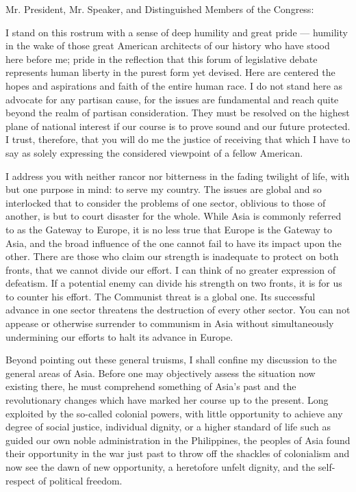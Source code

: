\documentclass[a4paper]{amsbook}
\begin{document}
Mr. President, Mr. Speaker, and Distinguished Members of the Congress:

I stand on this rostrum with a sense of deep humility and great pride — humility in the wake of those great American architects of our history who have stood here before me; pride in the reflection that this forum of legislative debate represents human liberty in the purest form yet devised. Here are centered the hopes and aspirations and faith of the entire human race. I do not stand here as advocate for any partisan cause, for the issues are fundamental and reach quite beyond the realm of partisan consideration. They must be resolved on the highest plane of national interest if our course is to prove sound and our future protected. I trust, therefore, that you will do me the justice of receiving that which I have to say as solely expressing the considered viewpoint of a fellow American.

I address you with neither rancor nor bitterness in the fading twilight of life, with but one purpose in mind: to serve my country. The issues are global and so interlocked that to consider the problems of one sector, oblivious to those of another, is but to court disaster for the whole. While Asia is commonly referred to as the Gateway to Europe, it is no less true that Europe is the Gateway to Asia, and the broad influence of the one cannot fail to have its impact upon the other. There are those who claim our strength is inadequate to protect on both fronts, that we cannot divide our effort. I can think of no greater expression of defeatism. If a potential enemy can divide his strength on two fronts, it is for us to counter his effort. The Communist threat is a global one. Its successful advance in one sector threatens the destruction of every other sector. You can not appease or otherwise surrender to communism in Asia without simultaneously undermining our efforts to halt its advance in Europe.

Beyond pointing out these general truisms, I shall confine my discussion to the general areas of Asia. Before one may objectively assess the situation now existing there, he must comprehend something of Asia's past and the revolutionary changes which have marked her course up to the present. Long exploited by the so-called colonial powers, with little opportunity to achieve any degree of social justice, individual dignity, or a higher standard of life such as guided our own noble administration in the Philippines, the peoples of Asia found their opportunity in the war just past to throw off the shackles of colonialism and now see the dawn of new opportunity, a heretofore unfelt dignity, and the self-respect of political freedom.
\end{document}
